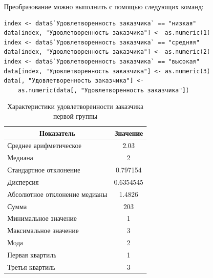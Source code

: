 Преобразование можно выполнить с помощью следующих команд:
\begin{verbatim}
index <- data$`Удовлетворенность заказчика` == "низкая"
data[index, "Удовлетворенность заказчика"] <- as.numeric(1)
index <- data$`Удовлетворенность заказчика` == "средняя"
data[index, "Удовлетворенность заказчика"] <- as.numeric(2)
index <- data$`Удовлетворенность заказчика` == "высокая"
data[index, "Удовлетворенность заказчика"] <- as.numeric(3)
data[, "Удовлетворенность заказчика"] <- 
    as.numeric(data[, "Удовлетворенность заказчика"])

\end{verbatim}

\begin{table}[H]
	\centering
	\caption{Характеристики удовлетворенности заказчика первой группы}
	\begin{tabular}{|l|c|}
		\hline
		\multicolumn{1}{|c|}{\textbf{Показатель}} & \textbf{Значение}\\ \hline
		Среднее арифметическое        & 2.03      \\ \hline
		Медиана                       & 2         \\ \hline
		Стандартное отклонение        & 0.797154  \\ \hline
		Дисперсия                      & 0.6354545 \\ \hline
		Абсолютное отклонение медианы & 1.4826    \\ \hline
		Сумма                         & 203       \\ \hline
		Минимальное значение          & 1         \\ \hline
		Максимальное значение         & 3         \\ \hline
		Мода & 2 \\ \hline
		Первая квартиль & 1 \\ \hline
		Третья квартиль & 3 \\ \hline
	\end{tabular}
\end{table}

